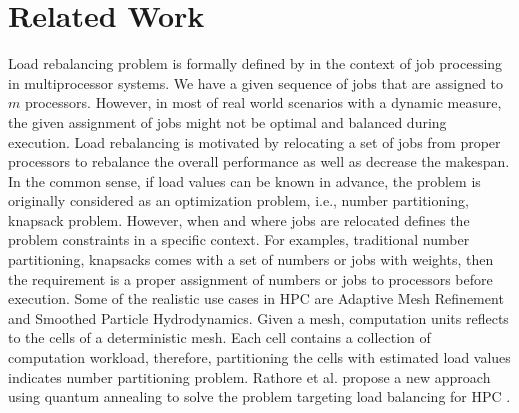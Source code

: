 
\section{Related Work} \label{sec:relatedwork}


Load rebalancing problem is formally defined by \cite{aggarwal2003lrb} in the context of job processing in multiprocessor systems. We have a given sequence of jobs that are assigned to $m$ processors. However, in most of real world scenarios with a dynamic measure, the given assignment of jobs might not be optimal and balanced during execution. Load rebalancing is motivated by relocating a set of jobs from proper processors to rebalance the overall performance as well as decrease the makespan. \\

In the common sense, if load values can be known in advance, the problem is originally considered as an optimization problem, i.e., number partitioning, knapsack problem. However, when and where jobs are relocated defines the problem constraints in a specific context. For examples, traditional number partitioning, knapsacks comes with a set of numbers or jobs with weights, then the requirement is a proper assignment of numbers or jobs to processors before execution. Some of the realistic use cases in HPC are Adaptive Mesh Refinement and Smoothed Particle Hydrodynamics. Given a mesh, computation units reflects to the cells of a deterministic mesh. Each cell contains a collection of computation workload, therefore, partitioning the cells with estimated load values indicates number partitioning problem. Rathore et al. propose a new approach using quantum annealing to solve the problem targeting load balancing for HPC \cite{rathore2024lbhpc}.